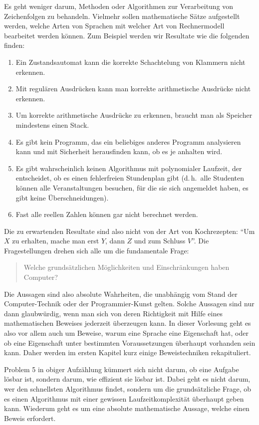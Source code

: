 Es geht weniger darum, Methoden oder Algorithmen zur Verarbeitung
von Zeichenfolgen zu behandeln.
Vielmehr sollen mathematische Sätze aufgestellt werden, welche
Arten von Sprachen mit welcher Art von Rechnermodell bearbeitet
werden können.
Zum Beispiel werden wir Resultate wie die folgenden finden:
\begin{enumerate}
\item Ein Zustandsautomat kann die korrekte Schachtelung von
Klammern nicht erkennen.
\item Mit regulären Ausdrücken kann man korrekte arithmetische
Ausdrücke nicht erkennen.
\item Um korrekte arithmetische Ausdrücke zu erkennen, braucht man als
Speicher mindestens einen Stack.
\item Es gibt kein Programm, das ein beliebiges anderes Programm
analysieren kann und mit Sicherheit herausfinden kann, ob es je anhalten
wird.
\item Es gibt wahrscheinlich keinen Algorithmus mit polynomialer Laufzeit,
der entscheidet, ob es einen fehlerfreien Stundenplan gibt (d.\,h.~alle 
Studenten können alle Veranstaltungen besuchen, für die sie sich
angemeldet haben, es gibt keine Überschneidungen).
\item Fast alle reellen Zahlen können gar nicht berechnet werden.
\end{enumerate}
Die zu erwartenden Resultate sind also nicht von der Art von Kochrezepten:
``Um $X$ zu erhalten, mache man erst $Y$, dann $Z$ und zum Schluss $V$''.
Die Fragestellungen drehen sich alle um die fundamentale Frage:
\begin{quote}
Welche grundsätzlichen Möglichkeiten und Einschränkungen haben
Computer?
\end{quote}
Die Aussagen sind also absolute Wahrheiten, die unabhängig vom Stand
der Com\-pu\-ter-Technik oder der Programmier-Kunst gelten.
Solche Aussagen sind nur dann glaub\-würdig, wenn man sich von deren
Richtigkeit mit Hilfe eines mathematischen Beweises jederzeit überzeugen
kann.
In dieser Vorlesung geht es also vor allem auch um Beweise, 
warum eine Sprache eine Eigenschaft hat, oder ob eine Eigenschaft
unter bestimmten Voraussetzungen überhaupt vorhanden sein kann.
Daher werden im ersten Kapitel kurz einige Beweistechniken rekapituliert.

Problem 5 in obiger Aufzählung kümmert sich nicht darum, ob eine
Aufgabe lösbar ist, sondern darum, wie effizient sie lösbar ist.
Dabei geht es nicht darum, wer den schnellsten Algorithmus findet,
sondern um die grundsätzliche Frage, ob es einen Algorithmus mit
einer gewissen Laufzeitkomplexität überhaupt geben kann.
Wiederum geht es um eine absolute mathematische Aussage, welche
einen Beweis erfordert.

